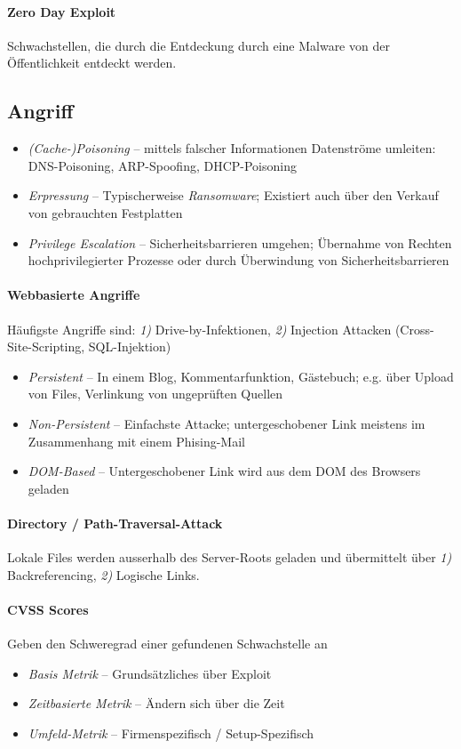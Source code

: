 \documentclass[a4paper,12pt]{article}
\begin{document}
\paragraph{Zero Day Exploit}
Schwachstellen, die durch die Entdeckung durch eine Malware von der Öffentlichkeit entdeckt werden.


\subsection{Angriff}
\begin{itemize}
\item \emph{(Cache-)Poisoning} -- mittels falscher Informationen Datenströme umleiten: DNS-Poisoning, ARP-Spoofing, DHCP-Poisoning
\item \emph{Erpressung} -- Typischerweise \emph{Ransomware}; Existiert auch über den Verkauf von gebrauchten Festplatten
\item \emph{Privilege Escalation} -- Sicherheitsbarrieren umgehen; Übernahme von Rechten hochprivilegierter Prozesse oder durch Überwindung von Sicherheitsbarrieren
\end{itemize}

\paragraph{Webbasierte Angriffe}
Häufigste Angriffe sind: \emph{1)} Drive-by-Infektionen, \emph{2)} Injection Attacken (Cross-Site-Scripting, SQL-Injektion)

\begin{itemize}
\item \emph{Persistent} -- In einem Blog, Kommentarfunktion, Gästebuch; e.g. über Upload von Files, Verlinkung von ungeprüften Quellen
\item \emph{Non-Persistent} -- Einfachste Attacke; untergeschobener Link meistens im Zusammenhang mit einem Phising-Mail
\item \emph{DOM-Based} -- Untergeschobener Link wird aus dem DOM des Browsers geladen
\end{itemize}


\paragraph{Directory / Path-Traversal-Attack} Lokale Files werden ausserhalb des Server-Roots geladen und übermittelt über \emph{1)} Backreferencing, \emph{2)} Logische Links.


\paragraph{CVSS Scores} Geben den Schweregrad einer gefundenen Schwachstelle an
\begin{itemize}
\item \emph{Basis Metrik} -- Grundsätzliches über Exploit
\item \emph{Zeitbasierte Metrik} -- Ändern sich über die Zeit
\item \emph{Umfeld-Metrik} -- Firmenspezifisch / Setup-Spezifisch
\end{itemize}
\end{document}
